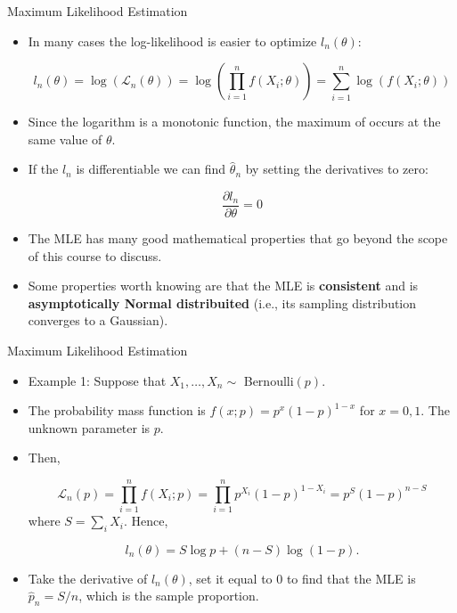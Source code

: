 \documentclass[handout]{beamer}
\begin{document}
\begin{frame}{Maximum Likelihood Estimation}
\scriptsize{
\begin{itemize}
 \item In many cases the log-likelihood is easier to optimize $l_n(\theta)$:
 
 \begin{displaymath}
l_n(\theta) = \log(\mathcal{L}_{n}(\theta))=\log(\prod_{i=1}^nf(X_i;\theta))= \sum_{i=1}^{n}\log(f(X_i;\theta))  
 \end{displaymath} 

\item Since the logarithm is a monotonic function, the maximum of occurs at the same value of $\theta$.
 
\item If the $l_n$ is differentiable we can find   $\hat{\theta}_n$ by setting the derivatives to zero:

\begin{displaymath}
 \frac{\partial l_n}{\partial \theta} = 0
\end{displaymath}

\item The MLE has many good mathematical properties that go beyond the scope of this course to discuss.

\item Some properties worth knowing are that the MLE is \textbf{consistent} and is \textbf{asymptotically Normal distribuited} (i.e., its sampling distribution converges to a Gaussian).

\end{itemize}


} 
 
\end{frame}


\begin{frame}{Maximum Likelihood Estimation}
\scriptsize{
\begin{itemize}
 \item Example 1: Suppose that $X_1,\dots, X_n \sim$  Bernoulli$(p)$. 
 \item The probability mass function is $f(x;p)= p^x(1- p)^{1-x}$ for $x = 0,1$. The unknown parameter is $p$. 
 \item Then,
 
 \begin{displaymath}
\mathcal{L}_{n}(p)=\prod_{i=1}^nf(X_i;p) = \prod_{i=1}^np^{X_i}(1-p)^{1-X_i}=p^S(1-p)^{n-S} 
 \end{displaymath} 
where $S=\sum_{i}X_i$. Hence, 
 
 \begin{displaymath}
l_n(\theta) = S\log p+ (n-S)\log(1-p). 
 \end{displaymath}  
 
\item Take the derivative of $l_n(\theta)$, set it equal to 0 to find that the MLE is $\hat{p}_n =S/n$, which is the sample proportion.
 
\end{itemize}


} 
 
\end{frame}
\end{document}
